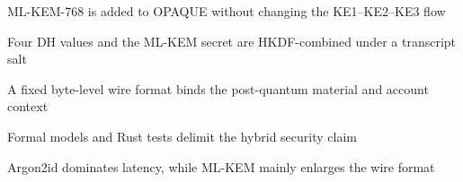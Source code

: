 
\begin{highlights}
\item ML-KEM-768 is added to OPAQUE without changing the KE1--KE2--KE3 flow
\item Four DH values and the ML-KEM secret are HKDF-combined under a transcript salt
\item A fixed byte-level wire format binds the post-quantum material and account context
\item Formal models and Rust tests delimit the hybrid security claim
\item Argon2id dominates latency, while ML-KEM mainly enlarges the wire format
\end{highlights}
